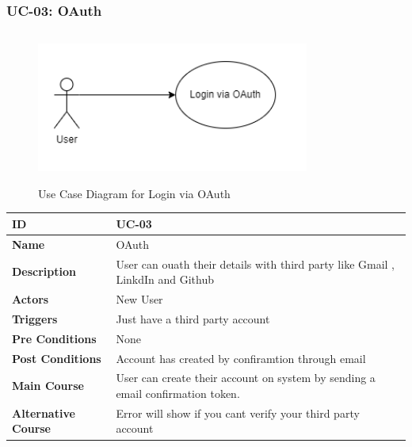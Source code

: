     \subsubsection{UC-03: OAuth}
    \begin{figure}[H]
        \includegraphics[height=5cm, width=0.8\textwidth]{./diagrams/Use Case/u3.png}
        \centering 
        \caption{Use Case Diagram for Login via OAuth}
        \label{Usecase1}
        \end{figure}
        
    \begin{center}
        \begin{tabularx}{\textwidth}{|l|X|}
            \hline
            \textbf{ID} & UC-03 \\
            \hline
            \textbf{Name} & OAuth \\
            \hline
            \textbf{Description} & User can ouath their details with third party like Gmail , LinkdIn and Github \\
            \hline
            \textbf{Actors} & New User \\
            \hline
            \textbf{Triggers} & Just have a third party account  \\
            \hline
            \textbf{Pre Conditions} & None \\
            \hline
            \textbf{Post Conditions} & Account has created by confiramtion through email  \\
            \hline
            \textbf{Main Course} & User can create their account on system by sending a email confirmation token. \\
            \hline
            \textbf{Alternative Course} & Error will show if you cant verify your third party account \\
            \hline
            
        \end{tabularx}
    \end{center}
    \newpage
    

